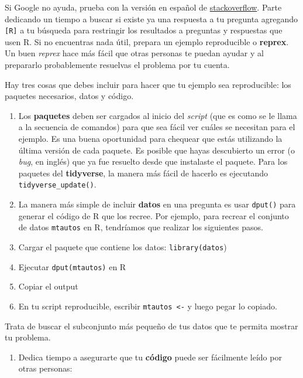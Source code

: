 \documentclass[11pt,oneside]{report}
\providecommand{\tightlist}{%
  \setlength{\itemsep}{0pt}\setlength{\parskip}{0pt}}
\begin{document}
Si Google no ayuda, prueba con la versión en español de
\href{https://es.stackoverflow.com/}{stackoverflow}. Parte dedicando un
tiempo a buscar si existe ya una respuesta a tu pregunta agregando
\texttt{{[}R{]}} a tu búsqueda para restringir los resultados a
preguntas y respuestas que usen R. Si no encuentras nada útil, prepara
un ejemplo reproducible o \textbf{reprex}. Un buen \emph{reprex} hace
más fácil que otras personas te puedan ayudar y al prepararlo
probablemente resuelvas el problema por tu cuenta.

Hay tres cosas que debes incluir para hacer que tu ejemplo sea
reproducible: los paquetes necesarios, datos y código.

\begin{enumerate}
\def\labelenumi{\arabic{enumi}.}
\item
  Los \textbf{paquetes} deben ser cargados al inicio del \emph{script}
  (que es como se le llama a la secuencia de comandos) para que sea
  fácil ver cuáles se necesitan para el ejemplo. Es una buena
  oportunidad para chequear que estás utilizando la última versión de
  cada paquete. Es posible que hayas descubierto un error (o \emph{bug},
  en inglés) que ya fue resuelto desde que instalaste el paquete. Para
  los paquetes del \textbf{tidyverse}, la manera más fácil de hacerlo es
  ejecutando \texttt{tidyverse\_update()}.
\item
  La manera más simple de incluir \textbf{datos} en una pregunta es usar
  \texttt{dput()} para generar el código de R que los recree. Por
  ejemplo, para recrear el conjunto de datos \texttt{mtautos} en R,
  tendríamos que realizar los siguientes pasos.
\item
  Cargar el paquete que contiene los datos: \texttt{library(datos})
\item
  Ejecutar \texttt{dput(mtautos)} en R
\item
  Copiar el output
\item
  En tu script reproducible, escribir \texttt{mtautos\ \textless{}-} y
  luego pegar lo copiado.
\end{enumerate}

Trata de buscar el subconjunto más pequeño de tus datos que te permita
mostrar tu problema.

\begin{enumerate}
\def\labelenumi{\arabic{enumi}.}
\tightlist
\item
  Dedica tiempo a asegurarte que tu \textbf{código} puede ser fácilmente
  leído por otras personas:
\end{enumerate}
\end{document}
